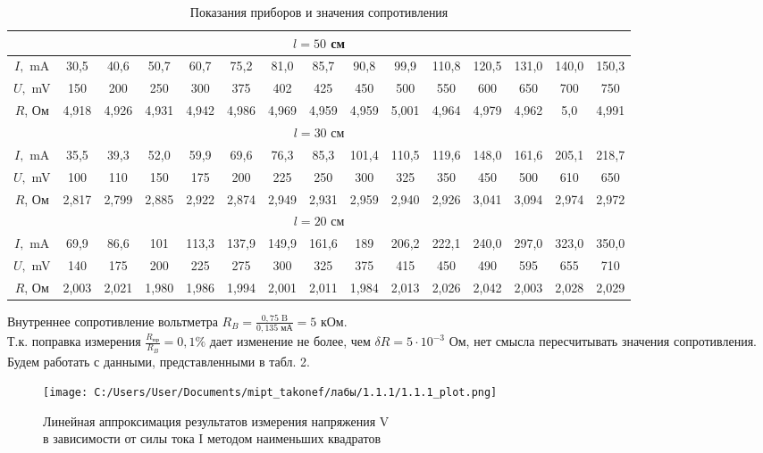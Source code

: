 \documentclass[a4paper]{article}
\begin{document}
\begin{table}[h]
\setlength{\tabcolsep}{0.15cm}
\renewcommand{\arraystretch}{1.6} 
\caption{Показания приборов и значения сопротивления}
\centering
\begin{tabular}{|c|c|c|c|c|c|c|c|c|c|c|c|c|c|c|}
\hline
\multicolumn{15}{|c|}{ $l = 50$ см} \\
\hline
$I,$ mA  & 30,5 & 40,6 & 50,7 & 60,7 & 75,2 & 81,0 & 85,7 & 90,8 & 99,9 & 110,8 & 120,5 & 131,0 & 140,0 & 150,3 \\
\hline
$U,$ mV & 150 & 200 & 250 & 300 & 375 & 402 & 425 & 450 & 500 & 550 & 600 & 650& 700 & 750 \\
\hline
$R$, Ом & 4,918 & 4,926 & 4,931 & 4,942 & 4,986 & 4,969 & 4,959 & 4,959 & 5,001 & 4,964 & 4,979 & 4,962 & 5,0 & 4,991 \\

\hline
\multicolumn{15}{|c|}{ $l = 30$ см} \\
\hline
$I,$ mA & 35,5 & 39,3 & 52,0 & 59,9 & 69,6 & 76,3 & 85,3 & 101,4 & 110,5 & 119,6 & 148,0 & 161,6 & 205,1 & 218,7 \\
\hline
$U,$ mV & 100 & 110 & 150 & 175 & 200 & 225 & 250 & 300 & 325 & 350 & 450 & 500 & 610 & 650 \\
\hline
$R$, Ом & 2,817 & 2,799 & 2,885 & 2,922 & 2,874 & 2,949 & 2,931 & 2,959 & 2,940 & 2,926 & 3,041 & 3,094 & 2,974 & 2,972 \\

\hline
\multicolumn{15}{|c|}{ $l = 20$ см} \\
\hline
$I,$ mA & 69,9 & 86,6 & 101 & 113,3 & 137,9 & 149,9 & 161,6 & 189 & 206,2 & 222,1 & 240,0 & 297,0 & 323,0 & 350,0 \\
\hline
$U,$ mV & 140 & 175 & 200 & 225 & 275 & 300 & 325 & 375 & 415 & 450 & 490 & 595 & 655 & 710 \\
\hline
$R$, Ом & 2,003 & 2,021 & 1,980 & 1,986 & 1,994 & 2,001 & 2,011 & 1,984 & 2,013 & 2,026 & 2,042 & 2,003 & 2,028 & 2,029 \\
\hline
\end{tabular}
\end{table}

Внутреннее сопротивление вольтметра $R_B = \frac{0,75 \text{ B}}{0,135 \text{ мА}} = 5$ кОм.\\
Т.к. поправка измерения $\frac{R_\text{пр}}{R_B} = 0,1 \%$ дает изменение не более, чем $\delta R = 5 \cdot 10^{-3}$ Ом, нет смысла пересчитывать значения сопротивления. Будем работать с данными, представленными в табл. 2.

\centering
\begin{figure}[h]
   \centering    
    \texttt{[image: C:/Users/User/Documents/mipt\_takonef/лабы/1.1.1/1.1.1\_plot.png]}
    \caption{Линейная аппроксимация результатов измерения напряжения V \\ в зависимости от силы тока I методом наименьших квадратов} 

\end{figure}
\end{document}
